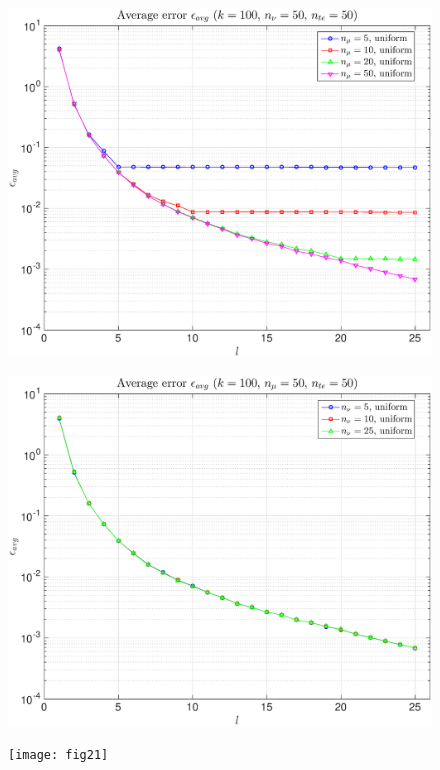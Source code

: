 \documentclass[11pt,a4paper]{article}
\theoremstyle{definition}
\theoremstyle{theorem}
\begin{document}
	\begin{figure}
		\center
		\includegraphics[scale=0.5]{fig19}
		\caption{}
	\end{figure}
	
	\begin{figure}
		\center
		\includegraphics[scale=0.5]{fig20}
		\caption{}
	\end{figure}
	
	\begin{figure}
		\center
		\texttt{[image: fig21]}
		\caption{}
	\end{figure}
	
\end{document}
